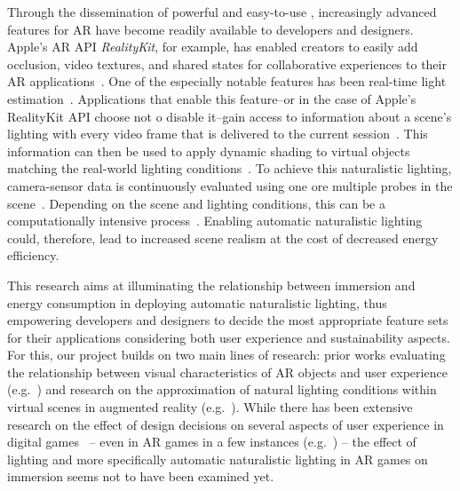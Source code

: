 \documentclass[12pt,twoside,english]{article}
\begin{document}
Through the dissemination of powerful and easy-to-use , increasingly advanced features for \gls{AR} have become readily available to developers and designers.
Apple's \gls{AR} \gls{API} \textit{RealityKit}, for example, has enabled creators to easily add occlusion, video textures, and shared states for collaborative experiences to their \gls{AR} applications~\cite{apple_realitykit_2020-1}.
One of the especially notable features has been real-time light estimation~\cite{apple_arlightestimate_2020}.
Applications that enable this feature--or in the case of Apple's RealityKit \gls{API} choose not o disable it--gain access to information about a scene's lighting with every video frame that is delivered to the current session~\cite{apple_arlightestimate_2020}.
This information can then be used to apply dynamic shading to virtual objects matching the real-world lighting conditions~\cite{apple_arlightestimate_2020}.
To achieve this naturalistic lighting, camera-sensor data is continuously evaluated using one ore multiple probes in the scene~\cite{apple_arlightestimate_2020,apple_disablearenvironmentlighting_2020}.
Depending on the scene and lighting conditions, this can be a computationally intensive process~\cite{steed_constructing_2016}.
Enabling automatic naturalistic lighting could, therefore, lead to increased scene realism at the cost of decreased energy efficiency.

This research aims at illuminating the relationship between immersion and energy consumption in deploying automatic naturalistic lighting, thus empowering developers and designers to decide the most appropriate feature sets for their applications considering both user experience and sustainability aspects.
For this, our project builds on two main lines of research: prior works evaluating the relationship between visual characteristics of \gls{AR} objects and user experience (e.g.~\cite{gabbard_effects_2006}) and research on the approximation of natural lighting conditions within virtual scenes in augmented reality (e.g.~\cite{aittala_inverse_2010}).
While there has been extensive research on the effect of design decisions on several aspects of user experience in digital games~\cite{johnson_validation_2018} -- even in \gls{AR} games in a few instances (e.g.~\cite{georgiou_development_2017}) -- the effect of lighting and more specifically automatic naturalistic lighting in \gls{AR} games on immersion seems not to have been examined yet.
\end{document}
